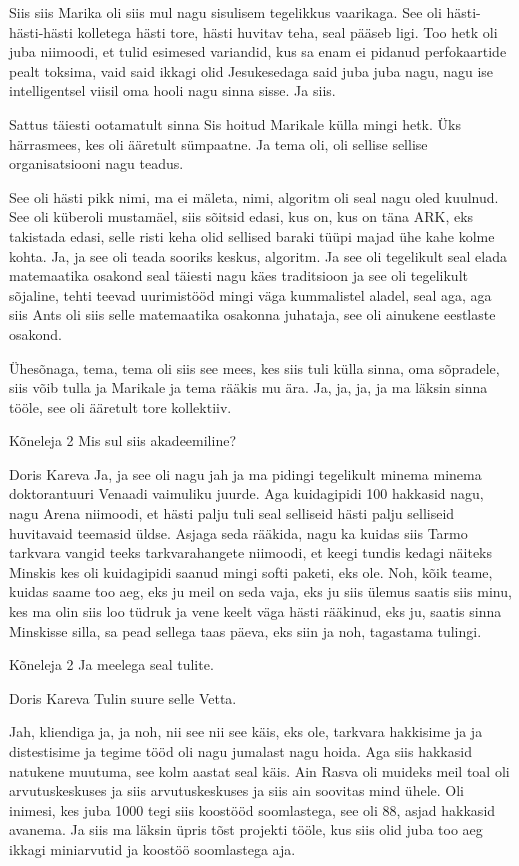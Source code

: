 Siis siis Marika oli siis mul nagu sisulisem tegelikkus vaarikaga. See oli hästi-hästi-hästi kolletega hästi tore, hästi huvitav teha, seal pääseb ligi. Too hetk oli juba niimoodi, et tulid esimesed variandid, kus sa enam ei pidanud perfokaartide pealt toksima, vaid said ikkagi olid Jesukesedaga said juba juba nagu, nagu ise intelligentsel viisil oma hooli nagu sinna sisse. Ja siis. 

Sattus täiesti ootamatult sinna Sis hoitud Marikale külla mingi hetk. Üks härrasmees, kes oli ääretult sümpaatne. Ja tema oli, oli sellise sellise organisatsiooni nagu teadus. 

See oli hästi pikk nimi, ma ei mäleta, nimi, algoritm oli seal nagu oled kuulnud. See oli küberoli mustamäel, siis sõitsid edasi, kus on, kus on täna ARK, eks takistada edasi, selle risti keha olid sellised baraki tüüpi majad ühe kahe kolme kohta. Ja, ja see oli teada sooriks keskus, algoritm. Ja see oli tegelikult seal elada matemaatika osakond seal täiesti nagu käes traditsioon ja see oli tegelikult sõjaline, tehti teevad uurimistööd mingi väga kummalistel aladel, seal aga, aga siis Ants oli siis selle matemaatika osakonna juhataja, see oli ainukene eestlaste osakond. 

Ühesõnaga, tema, tema oli siis see mees, kes siis tuli külla sinna, oma sõpradele, siis võib tulla ja Marikale ja tema rääkis mu ära. Ja, ja, ja, ja ma läksin sinna tööle, see oli ääretult tore kollektiiv. 

Kõneleja 2
Mis sul siis akadeemiline? 

Doris Kareva
Ja, ja see oli nagu jah ja ma pidingi tegelikult minema minema doktorantuuri Venaadi vaimuliku juurde. Aga kuidagipidi 100 hakkasid nagu, nagu Arena niimoodi, et hästi palju tuli seal selliseid hästi palju selliseid huvitavaid teemasid üldse. Asjaga seda rääkida, nagu ka kuidas siis Tarmo tarkvara vangid teeks tarkvarahangete niimoodi, et keegi tundis kedagi näiteks Minskis kes oli kuidagipidi saanud mingi softi paketi, eks ole. Noh, kõik teame, kuidas saame too aeg, eks ju meil on seda vaja, eks ju siis ülemus saatis siis minu, kes ma olin siis loo tüdruk ja vene keelt väga hästi rääkinud, eks ju, saatis sinna Minskisse silla, sa pead sellega taas päeva, eks siin ja noh, tagastama tulingi. 

Kõneleja 2
Ja meelega seal tulite. 

Doris Kareva
Tulin suure selle Vetta. 

Jah, kliendiga ja, ja noh, nii see nii see käis, eks ole, tarkvara hakkisime ja ja distestisime ja tegime tööd oli nagu jumalast nagu hoida. Aga siis hakkasid natukene muutuma, see kolm aastat seal käis. Ain Rasva oli muideks meil toal oli arvutuskeskuses ja siis arvutuskeskuses ja siis ain soovitas mind ühele. Oli inimesi, kes juba 1000 tegi siis koostööd soomlastega, see oli 88, asjad hakkasid avanema. Ja siis ma läksin üpris tõst projekti tööle, kus siis olid juba too aeg ikkagi miniarvutid ja koostöö soomlastega aja. 


